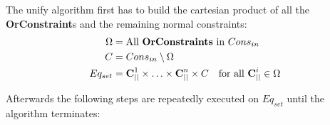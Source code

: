 The unify algorithm first has to build the cartesian product of all the \textbf{OrConstraint}s and the remaining normal constraints:
\begin{align*}
\Omega &= \text{All }\mathbf{OrConstraints} \text{ in } {Cons}_{in}\\
C &= {Cons}_{in} \setminus \Omega \\
Eq_{set} &= \textbf{C}_{||}^1 \times \ldots \times \textbf{C}_{||}^n \times C \quad \text{for all }\textbf{C}_{||}^i \in \Omega
\end{align*}

Afterwards the following steps are repeatedly executed on $Eq_{set}$ until the algorithm terminates:

